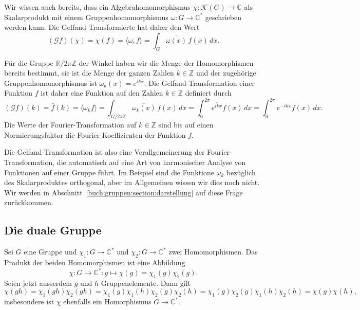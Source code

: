 Wir wissen auch bereits, dass ein Algebrahomomorphismus
$\chi\colon \mathscr{K}(G)\to\mathbb{C}$ als Skalarprodukt mit
einem Gruppenhomomorphismus 
$\omega\colon G\to\mathbb{C}^*$ geschrieben werden kann.
Die Gelfand-Transformierte hat daher den Wert
\[
(\mathscr{G}f)(\chi)
=
\chi(f)
=
\langle \omega ,f\rangle
=
\int_G \overline{\omega(x)}\,f(x)\,dx.
\]

\begin{beispiel}
Für die Gruppe $\mathbb{R}/2\pi\mathbb{Z}$ der Winkel haben wir die
Menge der Homomorphismen bereits bestimmt, sie ist die Menge der
ganzen Zahlen $k\in\mathbb{Z}$ und der zugehörige Gruppenhomomorphismus
ist $\omega_k(x) = e^{ikx}$.
Die Gelfand-Transformation einer Funktion $f$ ist daher eine Funktion
auf den Zahlen $k\in \mathbb{Z}$ definiert durch
\[
(\mathscr{G}f)(k)
=
\hat{f}(k)
=
\langle \omega_k f\rangle
=
\int_{G/2\pi \mathbb{Z}} \overline{\omega_k(x)}\, f(x) \,dx
=
\int_0^{2\pi} \overline{e^{ikx}} f(x)\,dx
=
\int_0^{2\pi} e^{-ikx} f(x)\,dx.
\]
Die Werte der Fourier-Transformation auf $k\in\mathbb{Z}$ sind bis auf einen
Normierungsfaktor die Fourier-Koeffizienten der Funktion $f$.
\end{beispiel}

Die Gelfand-Transformation ist also eine Verallgemeinerung der
Fourier-Transformation, die automatisch auf eine Art von harmonischer
Analyse von Funktionen auf einer Gruppe führt.
Im Beispiel sind die Funktione $\omega_k$ bezüglich des
Skalarproduktes orthogonal, aber im Allgemeinen wissen wir dies 
noch nicht.
Wir werden in Abschnitt~\ref{buch:gruppen:section:darstellung}
auf diese Frage zurückkommen.

%
%
\subsection{Die duale Gruppe
\label{buch:gruppen:gelfand:subsection:dual}}
Sei $G$ eine Gruppe und $\chi_1\colon G\to\mathbb{C}^*$
und $\chi_2\colon G\to\mathbb{C}^*$ zwei Homomorphismen.
Das Produkt der beiden Homomorphismen ist eine Abbildung
\[
\chi\colon G\to\mathbb{C}^*
:
g\mapsto \chi(g)=\chi_1(g)\chi_2(g).
\]
Seien jetzt ausserdem $g$ und $h$ Gruppenelemente.
Dann gilt
\begin{equation}
\chi(gh)
=
\chi_1(gh)\chi_2(gh)
=
\chi_1(g)\chi_1(h)\chi_2(g)\chi_2(h)
=
\chi_1(g)\chi_2(g)\chi_1(h)\chi_2(h)
=
\chi(g)\chi(h),
\label{buch:gruppen:gelfand:eqn:prodhomo}
\end{equation}
insbesondere ist $\chi$ ebenfalls ein Homorphismus $G\to\mathbb{C}^*$.

